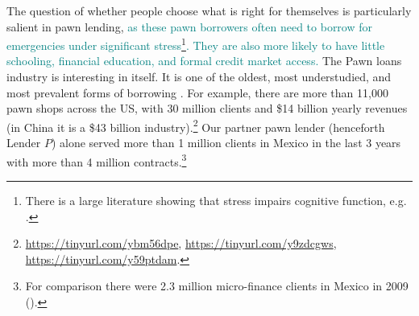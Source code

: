 \documentclass[oneside,11pt]{article}
\begin{document}
The question of whether people choose what is right for themselves is particularly salient in pawn lending, \textcolor{teal}{as these pawn borrowers often need to borrow for emergencies under significant stress\footnote{There is a large literature showing that stress impairs cognitive function, e.g. \cite{StressReview}.}. They are also more likely to have little schooling, financial education, and formal credit market access.}  The Pawn loans industry is interesting in itself. It is one  of the oldest, most understudied, and most prevalent forms of borrowing \citep{carter2012pawnshops}. For example, there are more than 11,000 pawn shops across the US, with 30 million clients and \$14 billion yearly revenues (in China it is a \$43 billion industry).\footnote{\url{https://tinyurl.com/ybm56dpe}, \url{https://tinyurl.com/y9zdcgws}, \url{https://tinyurl.com/y59ptdam}.} Our partner pawn lender (henceforth Lender $P$) alone served more than 1 million clients in Mexico in the last 3 years with more than 4 million contracts.\footnote{For comparison there were 2.3 million micro-finance clients in Mexico in 2009 (\cite{Pedroza:2010}).} 
\end{document}
